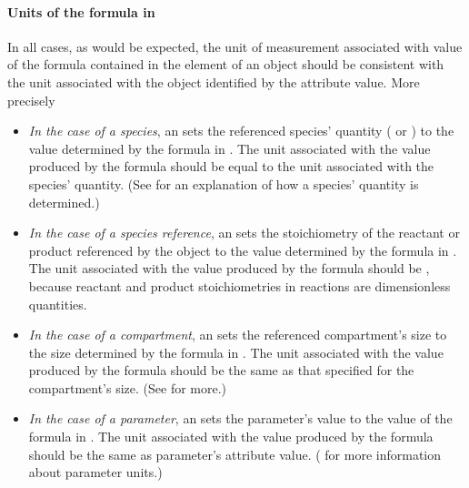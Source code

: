 \paragraph{Units of the  formula in }

In all cases, as would be expected, the unit of measurement
associated with value of the formula contained in the 
element of an \EventAssignment object should be consistent with
the unit associated with the object identified by the
 attribute value.  More precisely
\begin{itemize}
  
\item \emph{In the case of a species}, an \EventAssignment sets
  the referenced species' quantity ( or
  ) to the value determined by the formula in
  .  The unit associated with the value produced by
  the  formula should be equal to the unit associated
  with the species' quantity.  (See
   for an explanation of how a
  species' quantity is determined.)

\item \emph{In the case of a species reference}, an
  \EventAssignment sets the stoichiometry of the reactant or
  product referenced by the \SpeciesReference object to the value
  determined by the formula in .  The unit associated
  with the value produced by the  formula should be
  , because reactant and product
  stoichiometries in reactions are dimensionless quantities.

\item \emph{In the case of a compartment}, an \EventAssignment
  sets the referenced compartment's size to the size determined by
  the formula in .  The unit associated with the value
  produced by the  formula should be the same as that
  specified for the compartment's size.  (See
   for more.)

\item \emph{In the case of a parameter}, an \EventAssignment sets
  the parameter's value to the value of the formula in
  .  The unit associated with the value produced by
  the  formula should be the same as parameter's
   attribute value.
  ( for more information about
  parameter units.)


\end{itemize}

